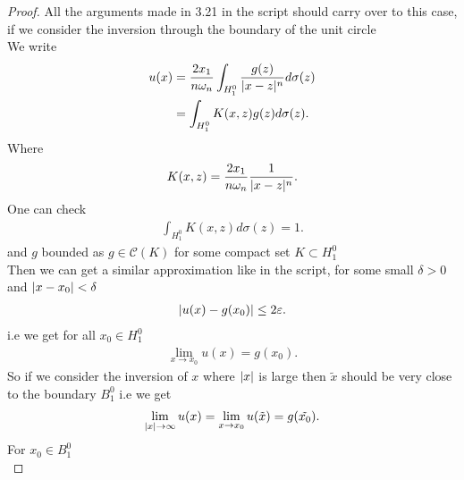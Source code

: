 \begin{proof}
  All the arguments  made in 3.21 in the script should carry over to this case, if we consider 
  the inversion through the boundary of the unit circle \\
  We write 
  \begin{align*}
    u(x) &= \frac{2x_{1}}{n \omega_n} \int_{H_1^{0} } \frac{g(z)}{\lvert x-z\rvert^{n} } d \sigma(z)\\
         &= \int_{H_1^{0} } K(x,z)g(z) d\sigma(z)
  .\end{align*}
  Where
  \begin{align*}
    K(x,z) =  \frac{2x_{1}}{n \omega_n} \frac{1}{\lvert x-z\rvert^{n} }
  .\end{align*}
  One can check 
  \begin{align*}
    \int_{H_1^{0} } K(x,z) d\sigma(z) = 1
  .\end{align*}
  and $g$ bounded as $g \in  \mathcal{C}(K)$ for some compact set $K \subset  H_1^{0} $\\[1ex]
  Then we can get a similar approximation like in the script, for some small $\delta >0$ and $\lvert x-x_{0}\rvert<\delta $
  \begin{align*}
    \lvert u(x) - g(x_0)\rvert \le 2 \varepsilon
  .\end{align*}
  i.e we get  for all $x_{0} \in  H_1^{0} $
  \begin{align*}
    \lim_{x \to x_{0}} u(x) = g(x_{0})
  .\end{align*}
  So if we consider the inversion of $x$ where $\lvert x\rvert$ is large then $\tilde{x} $ should be 
  very close to the boundary $B_1^0 $ i.e we get 
  \begin{align*}
    \lim_{\abs{x} \to  \infty} u(x) = \lim_{x \to x_{0}} u(\tilde{x} ) = g(\tilde{x_{0}} )
  .\end{align*}
  For $x_{0} \in  B_1^{0} $\\
\end{proof}

